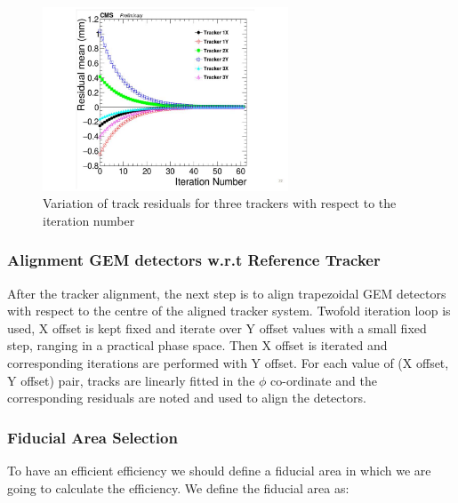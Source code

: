 \begin{figure}[!htbp]
\centering
\includegraphics[width=0.65\textwidth]{figures/GEM/Tracker_iterative_alignment.jpg}
\caption{Variation of track residuals for three trackers with respect to the iteration number}\label{fig:alignmentIteration}
\end{figure}

\subsubsection{Alignment GEM detectors w.r.t Reference Tracker}
After the tracker alignment, the next step is to align trapezoidal GEM detectors with respect to the centre of the aligned tracker system.
Twofold iteration loop is used, X offset is kept fixed and iterate over Y offset values with a small fixed step, ranging in a practical phase space. Then X offset is iterated and corresponding iterations are performed with Y offset. For each value of (X offset, Y offset) pair, tracks are linearly fitted in the $\phi$ co-ordinate and the corresponding residuals are noted and used to align the detectors.

\subsubsection{Fiducial Area Selection} %
\label{ssub:fiducial_area_selection}
To have an efficient efficiency we should define a fiducial area in which we are going to calculate the efficiency. We define the fiducial area as:

